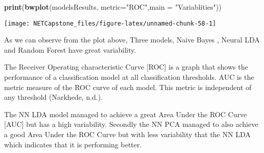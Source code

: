 \documentclass[
]{article}
\newenvironment{Shaded}{\begin{snugshade}}{\end{snugshade}}
\newcommand{\ControlFlowTok}[1]{\textcolor[rgb]{0.13,0.29,0.53}{\textbf{#1}}}
\newcommand{\DataTypeTok}[1]{\textcolor[rgb]{0.13,0.29,0.53}{#1}}
\newcommand{\KeywordTok}[1]{\textcolor[rgb]{0.13,0.29,0.53}{\textbf{#1}}}
\newcommand{\NormalTok}[1]{#1}
\newcommand{\OperatorTok}[1]{\textcolor[rgb]{0.81,0.36,0.00}{\textbf{#1}}}
\newcommand{\StringTok}[1]{\textcolor[rgb]{0.31,0.60,0.02}{#1}}
\begin{document}
\begin{Shaded}
\begin{Highlighting}[]
\KeywordTok{print}\NormalTok{(}\KeywordTok{bwplot}\NormalTok{(modelsResults, }\DataTypeTok{metric=}\StringTok{"ROC"}\NormalTok{,}\DataTypeTok{main =} \StringTok{"Variablities"}\NormalTok{))}
\end{Highlighting}
\end{Shaded}

\begin{center}\texttt{[image: NETCapstone\_files/figure-latex/unnamed-chunk-58-1]} \end{center}

As we can observe from the plot above, Three models, Naive Bayes ,
Neural LDA and Random Forest have great variability.

The Receiver Operating characteristic Curve {[}ROC{]} is a graph that
shows the performance of a classification model at all classification
thresholds. AUC is the metric measure of the ROC curve of each model.
This metric is independent of any threshold (Narkhede, n.d.).

The NN LDA model managed to achieve a great Area Under the ROC Curve
{[}AUC{]} but has a high variability. Secondly the NN PCA managed to
also achieve a good Area Under the ROC Curve but with less variability
that the NN LDA which indicates that it is performing better.\\

\begin{Shaded}
\end{Shaded}
\end{document}
